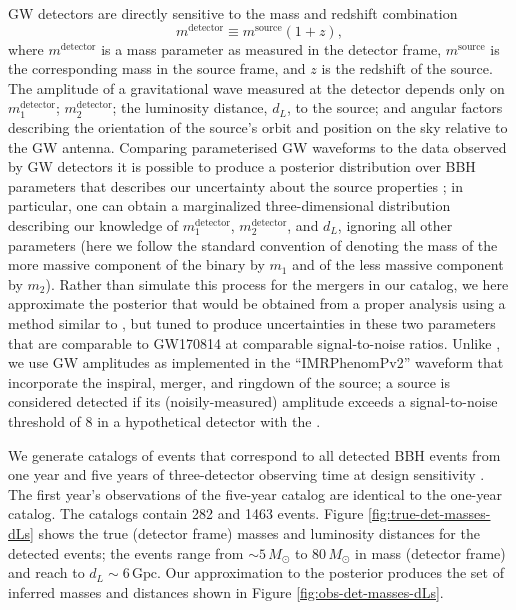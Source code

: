 \documentclass[modern]{aastex62}
\newcommand{\mdet}{m^\mathrm{detector}}
\newcommand{\monedet}{m_1^\mathrm{detector}}
\newcommand{\mtwodet}{m_2^\mathrm{detector}}
\newcommand{\msource}{m^\mathrm{source}}
\newcommand{\None}{282}
\newcommand{\Nfive}{1463}
\newcommand{\Gpc}{\mathrm{Gpc}}
\newcommand{\MSun}{M_\odot}
\begin{document}
\Ac{GW} detectors are directly sensitive to the mass and redshift combination
%
\begin{equation}
  \label{eq:Mdet-definition}
  \mdet \equiv \msource \left( 1 + z \right),
\end{equation}
%
where $\mdet$ is a mass parameter as measured in the detector frame, $\msource$
is the corresponding mass in the source frame, and $z$ is the redshift of the
source.  The amplitude of a gravitational wave measured at the detector depends
only on $\monedet$; $\mtwodet$; the luminosity distance, $d_L$, to the source;
and angular factors describing the orientation of the source's orbit and
position on the sky relative to the \ac{GW} antenna. Comparing parameterised
\ac{GW} waveforms
\citep[e.g.][]{Taracchini2014,Bohe2017,Smith2016,Kahn2016,Chatziioannou2017} to
the data observed by \ac{GW} detectors it is possible to produce a posterior
distribution over \ac{BBH} parameters that describes our uncertainty about the
source properties \citep{Veitch2015,GW150914-PE}; in particular, one can obtain
a marginalized three-dimensional distribution describing our knowledge of
$\monedet$, $\mtwodet$, and $d_L$, ignoring all other parameters (here we follow
the standard convention of denoting the mass of the more massive component of
the binary by $m_1$ and of the less massive component by $m_2$).  Rather than
simulate this process for the mergers in our catalog, we here approximate the
posterior that would be obtained from a proper analysis using a method similar
to \citet{Fishbach2018}, but tuned to produce uncertainties in these two
parameters that are comparable to GW170814 \citep{GW170814} at comparable
signal-to-noise ratios.  Unlike \citet{Fishbach2018}, we use \ac{GW} amplitudes
as implemented in the ``IMRPhenomPv2'' waveform \citep{Kahn2016} that
incorporate the inspiral, merger, and ringdown of the source; a source is
considered detected if its (noisily-measured) amplitude exceeds a
signal-to-noise threshold of 8 in a hypothetical detector with the .

We generate catalogs of events that correspond to all detected \ac{BBH} events
from one year and five years of three-detector observing time at design
sensitivity \citep{AdvancedLIGO,AdvancedVIRGO}.  The first year's observations
of the five-year catalog are identical to the one-year catalog. The catalogs
contain \None{} and \Nfive{} events.  Figure \ref{fig:true-det-masses-dLs} shows
the true (detector frame) masses and luminosity distances for the detected
events; the events range from $\sim 5 \, \MSun$ to $80 \, \MSun$ in mass
(detector frame) and reach to $d_L \sim 6 \, \Gpc$.  Our approximation to the
posterior produces the set of inferred masses and distances shown in Figure
\ref{fig:obs-det-masses-dLs}.
\end{document}
